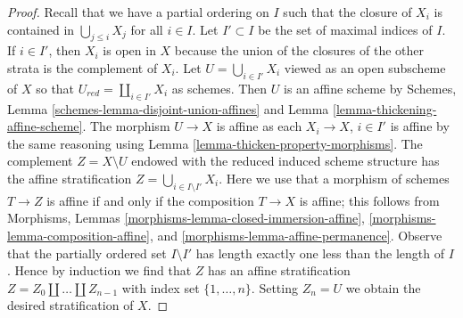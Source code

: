 \documentclass[10pt,a4paper]{amsart}
\theoremstyle{plain}
\theoremstyle{definition}
\theoremstyle{remark}
\numberwithin{equation}{subsection}
\begin{document}
\begin{proof}
Recall that we have a partial ordering on $I$ such that
the closure of $X_i$ is contained in $\bigcup_{j \leq i} X_j$
for all $i \in I$.
Let $I' \subset I$ be the set of maximal indices of $I$.
If $i \in I'$, then $X_i$ is open in $X$ because the union of the
closures of the other strata is the complement of $X_i$.
Let $U = \bigcup_{i \in I'} X_i$ viewed as an open subscheme of $X$
so that $U_{red} = \coprod_{i \in I'} X_i$ as schemes.
Then $U$ is an affine scheme by
Schemes, Lemma \ref{schemes-lemma-disjoint-union-affines}
and Lemma \ref{lemma-thickening-affine-scheme}. The morphism $U \to X$
is affine as each $X_i \to X$, $i \in I'$ is affine by the same reasoning
using Lemma \ref{lemma-thicken-property-morphisms}.
The complement $Z = X \setminus U$ endowed with the
reduced induced scheme structure has the affine
stratification $Z = \bigcup_{i \in I \setminus I'} X_i$.
Here we use that a morphism of schemes $T \to Z$ is affine
if and only if the composition $T \to X$ is affine; this follows
from Morphisms, Lemmas \ref{morphisms-lemma-closed-immersion-affine},
\ref{morphisms-lemma-composition-affine}, and
\ref{morphisms-lemma-affine-permanence}.
Observe that the partially ordered set $I \setminus I'$
has length exactly one less than the length of $I$.
Hence by induction we find that $Z$ has an affine
stratification $Z = Z_0 \amalg \ldots \amalg Z_{n - 1}$
with index set $\{1, \ldots, n\}$. Setting $Z_n = U$
we obtain the desired stratification of $X$.
\end{proof}
\end{document}
